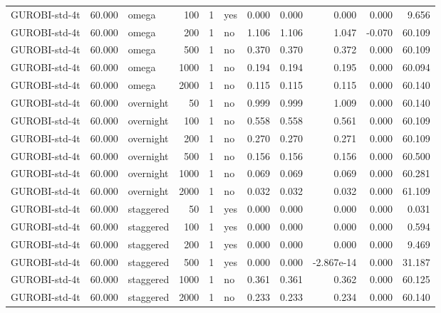 \begin{table}[htbp]
\begin{tabular}{lrlrrlrrrrr}
GUROBI-std-4t & 60.000 & omega & 100 & 1 & yes & 0.000 & 0.000 & 0.000 & 0.000 & 9.656 \\
GUROBI-std-4t & 60.000 & omega & 200 & 1 & no & 1.106 & 1.106 & 1.047 & -0.070 & 60.109 \\
GUROBI-std-4t & 60.000 & omega & 500 & 1 & no & 0.370 & 0.370 & 0.372 & 0.000 & 60.109 \\
GUROBI-std-4t & 60.000 & omega & 1000 & 1 & no & 0.194 & 0.194 & 0.195 & 0.000 & 60.094 \\
GUROBI-std-4t & 60.000 & omega & 2000 & 1 & no & 0.115 & 0.115 & 0.115 & 0.000 & 60.140 \\
GUROBI-std-4t & 60.000 & overnight & 50 & 1 & no & 0.999 & 0.999 & 1.009 & 0.000 & 60.140 \\
GUROBI-std-4t & 60.000 & overnight & 100 & 1 & no & 0.558 & 0.558 & 0.561 & 0.000 & 60.109 \\
GUROBI-std-4t & 60.000 & overnight & 200 & 1 & no & 0.270 & 0.270 & 0.271 & 0.000 & 60.109 \\
GUROBI-std-4t & 60.000 & overnight & 500 & 1 & no & 0.156 & 0.156 & 0.156 & 0.000 & 60.500 \\
GUROBI-std-4t & 60.000 & overnight & 1000 & 1 & no & 0.069 & 0.069 & 0.069 & 0.000 & 60.281 \\
GUROBI-std-4t & 60.000 & overnight & 2000 & 1 & no & 0.032 & 0.032 & 0.032 & 0.000 & 61.109 \\
GUROBI-std-4t & 60.000 & staggered & 50 & 1 & yes & 0.000 & 0.000 & 0.000 & 0.000 & 0.031 \\
GUROBI-std-4t & 60.000 & staggered & 100 & 1 & yes & 0.000 & 0.000 & 0.000 & 0.000 & 0.594 \\
GUROBI-std-4t & 60.000 & staggered & 200 & 1 & yes & 0.000 & 0.000 & 0.000 & 0.000 & 9.469 \\
GUROBI-std-4t & 60.000 & staggered & 500 & 1 & yes & 0.000 & 0.000 & -2.867e-14 & 0.000 & 31.187 \\
GUROBI-std-4t & 60.000 & staggered & 1000 & 1 & no & 0.361 & 0.361 & 0.362 & 0.000 & 60.125 \\
GUROBI-std-4t & 60.000 & staggered & 2000 & 1 & no & 0.233 & 0.233 & 0.234 & 0.000 & 60.140 \\
\bottomrule
\end{tabular}
\end{table}
